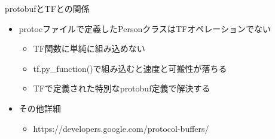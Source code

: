 \documentclass[aspectratio=169, dvipdfmx, 14pt, xcolor={svgnames,dvipsnames}, t]{beamer}
\begin{document}

\begin{frame}{protobufとTFとの関係}

  \begin{itemize}
    \tightlist
    \item
          protocファイルで定義したPersonクラスはTFオペレーションでない

          \begin{itemize}
            \tightlist
            \item
                  TF関数に単純に組み込めない
            \item
                  tf.py\_function()で組み込むと速度と可搬性が落ちる
            \item
                  TFで定義された特別なprotobuf定義で解決する
          \end{itemize}
    \item
          その他詳細

          \begin{itemize}
            \tightlist
            \item
                  https://developers.google.com/protocol-buffers/
          \end{itemize}
  \end{itemize}

\end{frame}

\end{document}
